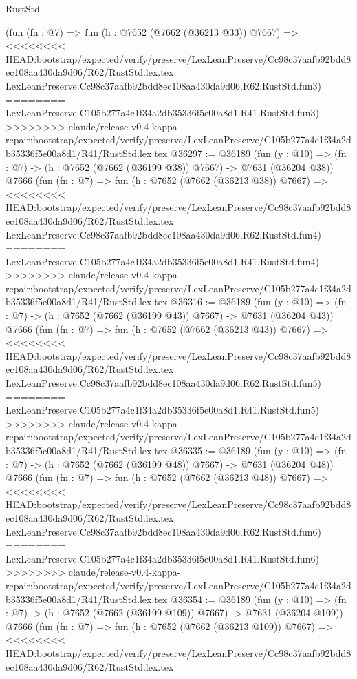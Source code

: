 \begin{lexlean}{RustStd}
\begin{coremodule}
{\begin{coremodule}
{{{{{{{{{{{{{{{{{{{{{{{{{{{{{{{{{{{{{{{{{{{{{{{{{{{{{    (fun (fn : @7) =>
    fun (h : @7652 (@7662 (@36213 @33)) @7667) =>
<<<<<<<< HEAD:bootstrap/expected/verify/preserve/LexLeanPreserve/Cc98c37aafb92bdd8ec108aa430da9d06/R62/RustStd.lex.tex
    LexLeanPreserve.Cc98c37aafb92bdd8ec108aa430da9d06.R62.RustStd.fun3)
========
    LexLeanPreserve.C105b277a4c1f34a2db35336f5e00a8d1.R41.RustStd.fun3)
>>>>>>>> claude/release-v0.4-kappa-repair:bootstrap/expected/verify/preserve/LexLeanPreserve/C105b277a4c1f34a2db35336f5e00a8d1/R41/RustStd.lex.tex
@36297 := @36189
    (fun (y : @10) => (fn : @7) -> (h : @7652 (@7662 (@36199 @38)) @7667) -> @7631 (@36204 @38))
    @7666
    (fun (fn : @7) =>
    fun (h : @7652 (@7662 (@36213 @38)) @7667) =>
<<<<<<<< HEAD:bootstrap/expected/verify/preserve/LexLeanPreserve/Cc98c37aafb92bdd8ec108aa430da9d06/R62/RustStd.lex.tex
    LexLeanPreserve.Cc98c37aafb92bdd8ec108aa430da9d06.R62.RustStd.fun4)
========
    LexLeanPreserve.C105b277a4c1f34a2db35336f5e00a8d1.R41.RustStd.fun4)
>>>>>>>> claude/release-v0.4-kappa-repair:bootstrap/expected/verify/preserve/LexLeanPreserve/C105b277a4c1f34a2db35336f5e00a8d1/R41/RustStd.lex.tex
@36316 := @36189
    (fun (y : @10) => (fn : @7) -> (h : @7652 (@7662 (@36199 @43)) @7667) -> @7631 (@36204 @43))
    @7666
    (fun (fn : @7) =>
    fun (h : @7652 (@7662 (@36213 @43)) @7667) =>
<<<<<<<< HEAD:bootstrap/expected/verify/preserve/LexLeanPreserve/Cc98c37aafb92bdd8ec108aa430da9d06/R62/RustStd.lex.tex
    LexLeanPreserve.Cc98c37aafb92bdd8ec108aa430da9d06.R62.RustStd.fun5)
========
    LexLeanPreserve.C105b277a4c1f34a2db35336f5e00a8d1.R41.RustStd.fun5)
>>>>>>>> claude/release-v0.4-kappa-repair:bootstrap/expected/verify/preserve/LexLeanPreserve/C105b277a4c1f34a2db35336f5e00a8d1/R41/RustStd.lex.tex
@36335 := @36189
    (fun (y : @10) => (fn : @7) -> (h : @7652 (@7662 (@36199 @48)) @7667) -> @7631 (@36204 @48))
    @7666
    (fun (fn : @7) =>
    fun (h : @7652 (@7662 (@36213 @48)) @7667) =>
<<<<<<<< HEAD:bootstrap/expected/verify/preserve/LexLeanPreserve/Cc98c37aafb92bdd8ec108aa430da9d06/R62/RustStd.lex.tex
    LexLeanPreserve.Cc98c37aafb92bdd8ec108aa430da9d06.R62.RustStd.fun6)
========
    LexLeanPreserve.C105b277a4c1f34a2db35336f5e00a8d1.R41.RustStd.fun6)
>>>>>>>> claude/release-v0.4-kappa-repair:bootstrap/expected/verify/preserve/LexLeanPreserve/C105b277a4c1f34a2db35336f5e00a8d1/R41/RustStd.lex.tex
@36354 := @36189
    (fun (y : @10) => (fn : @7) -> (h : @7652 (@7662 (@36199 @109)) @7667) -> @7631 (@36204 @109))
    @7666
    (fun (fn : @7) =>
    fun (h : @7652 (@7662 (@36213 @109)) @7667) =>
<<<<<<<< HEAD:bootstrap/expected/verify/preserve/LexLeanPreserve/Cc98c37aafb92bdd8ec108aa430da9d06/R62/RustStd.lex.tex
}}}}}}}}}}}}}}}}}}}}}}}}}}}}}}}}}}}}}}}}}}}}}}}}}}}}}
\end{coremodule}}
\end{coremodule}
\end{lexlean}
